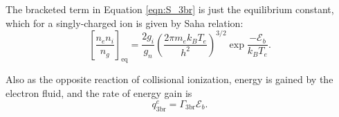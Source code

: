 The bracketed term in Equation \ref{eqn:S_3br} is just the equilibrium constant, which for a singly-charged ion is given by Saha relation:
\begin{equation}
    \label{eqn:saha}
    \left[ \frac{n_e n_i}{n_g} \right]_{\text{eq}} = \frac{2g_i}{g_n} \left( \frac{2\pi m_e k_B T_e}{h^2} \right)^{3/2} \exp{\frac{-\mathcal{E}_b}{k_B T_e}}.
\end{equation}

Also as the opposite reaction of collisional ionization, energy is gained by the electron fluid, and the rate of energy gain is
\begin{equation}
    \label{eqn:qe_3br}
    q^e_{\text{3br}} = \Gamma_{\text{3br}} \mathcal{E}_b.
\end{equation}